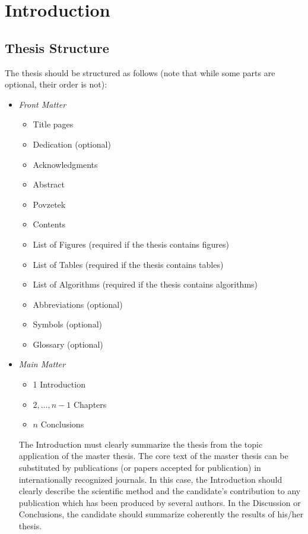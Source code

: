 % 
\chapter{Introduction}

\section{Thesis Structure}

The thesis should be structured as follows (note that while some parts are optional, their order is not):
\begin{itemize}
	\item \emph{Front Matter}
	\begin{itemize}
		\item Title pages
		\item Dedication (optional)
		\item Acknowledgments
		\item Abstract
		\item Povzetek
		\item Contents
		\item List of Figures (required if the thesis contains figures)
		\item List of Tables (required if the thesis contains tables)
		\item List of Algorithms (required if the thesis contains algorithms)
		\item Abbreviations (optional)
		\item Symbols (optional)
		\item Glossary (optional)
	\end{itemize}
	\item \emph{Main Matter}
	\begin{itemize}
		\item 1 Introduction
		\item $2, \dots, n-1$ Chapters
		\item $n$ Conclusions
	\end{itemize}
	The Introduction must clearly summarize the thesis from the topic application of the master thesis. The core text of the master thesis can be substituted by publications (or papers accepted for publication) in internationally recognized journals. In this case, the Introduction should clearly describe the scientific method and the candidate’s contribution to any publication which has been produced by several authors. In the Discussion or Conclusions, the candidate should summarize coherently the results of his/her thesis.

\end{itemize}
